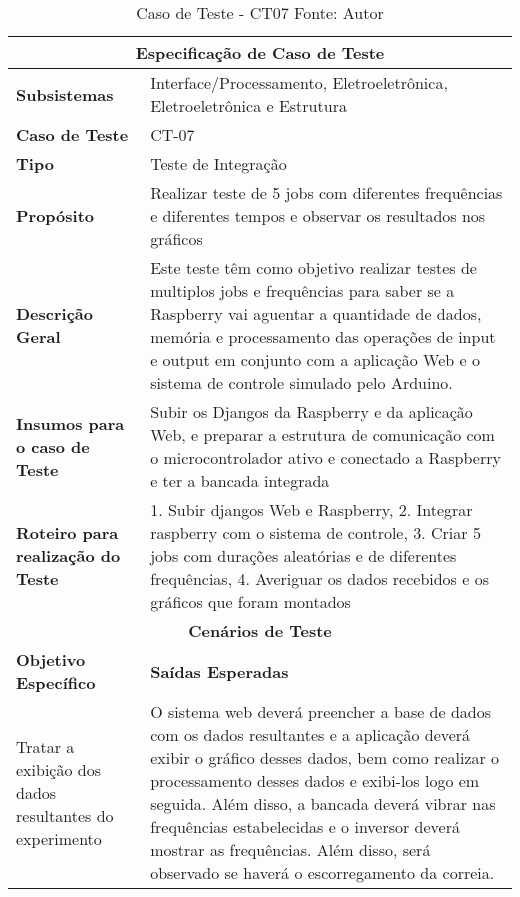 \begin{table}[H]
    \begin{center}
        \begin{tabular}{|p{5cm}|p{12cm}|}
            \hline
            \multicolumn{2}{|c|}{\textbf{Especificação de Caso de Teste}} \\ \hline
                \textbf{Subsistemas}                               &  Interface/Processamento, Eletroeletrônica, Eletroeletrônica e Estrutura \\ \hline
                \textbf{Caso de Teste}                             & CT-07 \\ \hline
                \textbf{Tipo}                                             & Teste de Integração \\ \hline
                \textbf{Propósito}                                     & Realizar teste de 5 jobs com diferentes frequências e diferentes tempos e observar os resultados nos gráficos \\ \hline
                \textbf{Descrição Geral}                           & Este teste têm como objetivo realizar testes de multiplos jobs e frequências para saber se a Raspberry vai aguentar a quantidade de dados, memória e processamento das operações de input  e output em conjunto com a aplicação Web e o sistema de controle simulado pelo Arduino. \\ \hline
                \textbf{Insumos para o caso de Teste}    & Subir os Djangos da Raspberry e da aplicação Web, e preparar a estrutura de comunicação com o microcontrolador ativo e conectado a Raspberry e ter a bancada integrada\\ \hline
                \textbf{Roteiro para realização do Teste}&  1. Subir djangos Web e Raspberry, 2. Integrar raspberry com o sistema de controle, 3. Criar 5 jobs com durações aleatórias e de diferentes frequências, 4. Averiguar os dados recebidos e os gráficos que foram montados  \\ \hline
            \multicolumn{2}{|c|}{\textbf{Cenários de Teste}} \\ \hline
                \textbf{Objetivo Específico}                      & \textbf{Saídas Esperadas} \\ \hline
                Tratar a exibição dos dados resultantes do experimento & O sistema web deverá preencher a base de dados com os dados resultantes e a aplicação deverá exibir o gráfico desses dados, bem como realizar o processamento desses dados e exibi-los logo em seguida.  Além disso, a bancada deverá vibrar nas frequências estabelecidas e o inversor deverá mostrar as frequências. Além disso, será observado se haverá o escorregamento da correia. \\ \hline
        \end{tabular}
    \end{center}
    \caption[Caso de Teste - CT07]{Caso de Teste - CT07
    \protect Fonte: Autor}
    \label{CT-07}
\end{table}

